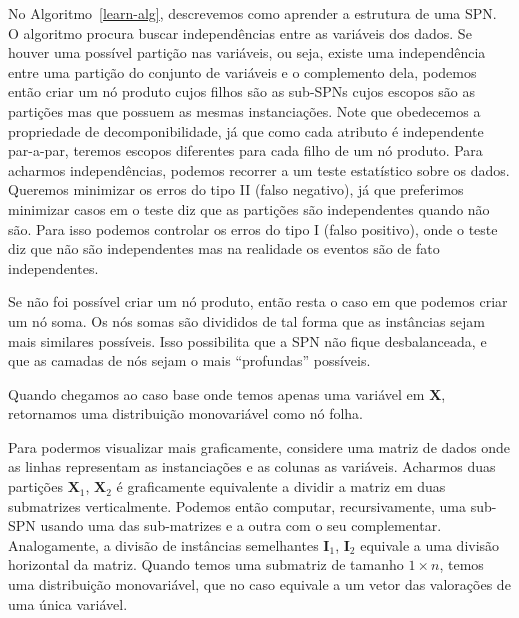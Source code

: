 \documentclass{amsart}
\theoremstyle{plain}
\numberwithin{equation}{section}
\newcommand{\set}[1]{\mathbf{#1}}
\begin{document}
No Algoritmo~\ref{learn-alg}, descrevemos como aprender a estrutura de uma SPN\@. O algoritmo
procura buscar independências entre as variáveis dos dados. Se houver uma possível partição nas
variáveis, ou seja, existe uma independência entre uma partição do conjunto de variáveis e o
complemento dela, podemos então criar um nó produto cujos filhos são as sub-SPNs cujos escopos são
as partições mas que possuem as mesmas instanciações. Note que obedecemos a propriedade de
decomponibilidade, já que como cada atributo é independente par-a-par, teremos escopos diferentes
para cada filho de um nó produto. Para acharmos independências, podemos recorrer a um teste
estatístico sobre os dados. Queremos minimizar os erros do tipo II (falso negativo), já que
preferimos minimizar casos em o teste diz que as partições são independentes quando não são.
Para isso podemos controlar os erros do tipo I (falso positivo), onde o teste diz que não são
independentes mas na realidade os eventos são de fato independentes.

Se não foi possível criar um nó produto, então resta o caso em que podemos criar um nó soma. Os nós
somas são divididos de tal forma que as instâncias sejam mais similares possíveis. Isso possibilita
que a SPN não fique desbalanceada, e que as camadas de nós sejam o mais ``profundas'' possíveis.

Quando chegamos ao caso base onde temos apenas uma variável em $\set{X}$, retornamos uma
distribuição monovariável como nó folha.

Para podermos visualizar mais graficamente, considere uma matriz de dados onde as linhas
representam as instanciações e as colunas as variáveis. Acharmos duas partições $\set{X}_1$,
$\set{X}_2$ é graficamente equivalente a dividir a matriz em duas submatrizes verticalmente.
Podemos então computar, recursivamente, uma sub-SPN usando uma das sub-matrizes e a outra com o seu
complementar. Analogamente, a divisão de instâncias semelhantes $\set{I}_1$, $\set{I}_2$ equivale
a uma divisão horizontal da matriz. Quando temos uma submatriz de tamanho $1\times n$, temos uma
distribuição monovariável, que no caso equivale a um vetor das valorações de uma única variável.


\newpage
\appendix

\newpage

\printbibliography[]
\end{document}

